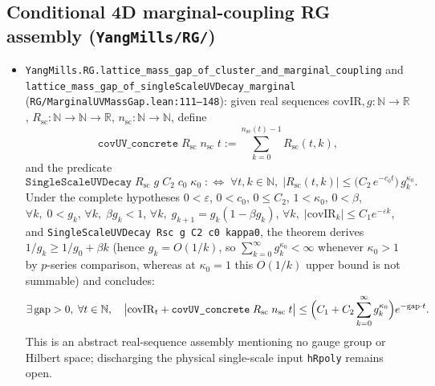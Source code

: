 \documentclass[11pt]{article}
\newcommand{\R}{\mathbb{R}}
\begin{document}
\subsection{Conditional 4D marginal-coupling RG assembly (\texttt{YangMills/RG/})}
\begin{itemize}
  \item \nolinkurl{YangMills.RG.lattice_mass_gap_of_cluster_and_marginal_coupling} and
  \nolinkurl{lattice_mass_gap_of_singleScaleUVDecay_marginal}
  (\texttt{RG/MarginalUVMassGap.lean:111--148}): given real sequences
  $\mathrm{covIR}, g : \mathbb{N} \to \R$, $R_{\mathrm{sc}} : \mathbb{N} \to \mathbb{N} \to \R$,
  $n_{\mathrm{sc}} : \mathbb{N} \to \mathbb{N}$, define
  \[
    \texttt{covUV\_concrete}\;R_{\mathrm{sc}}\;n_{\mathrm{sc}}\;t
    := \sum_{k=0}^{n_{\mathrm{sc}}(t)-1} R_{\mathrm{sc}}(t,k),
  \]
  and the predicate
  \[
    \texttt{SingleScaleUVDecay}\;R_{\mathrm{sc}}\;g\;C_2\;c_0\;\kappa_0
    \;:\Longleftrightarrow\;
    \forall t, k \in \mathbb{N},\;
    |R_{\mathrm{sc}}(t,k)| \le \bigl(C_2\, e^{-c_0 t}\bigr)\, g_k^{\kappa_0}.
  \]
  Under the complete hypotheses $0 < \varepsilon$, $0 < c_0$, $0 \le C_2$, $1 < \kappa_0$,
  \textbf{$0 < \beta$}, $\forall k,\; 0 < g_k$, $\forall k,\; \beta g_k < 1$,
  $\forall k,\; g_{k+1} = g_k(1 - \beta g_k)$,
  $\forall k,\; |\mathrm{covIR}_k| \le C_1 e^{-\varepsilon k}$, and
  \texttt{SingleScaleUVDecay Rsc g C2 c0 kappa0}, the theorem derives $1/g_k \ge 1/g_0 + \beta k$
  (hence $g_k = O(1/k)$, so $\sum_{k=0}^\infty g_k^{\kappa_0} < \infty$ whenever $\kappa_0 > 1$
  by $p$-series comparison, whereas at $\kappa_0 = 1$ this $O(1/k)$ upper bound is not
  summable) and concludes:
  \[
    \exists\,\mathrm{gap} > 0,\;\forall t \in \mathbb{N},\quad
    \bigl|\mathrm{covIR}_t + \texttt{covUV\_concrete}\;R_{\mathrm{sc}}\;n_{\mathrm{sc}}\;t\bigr|
    \le \Bigl(C_1 + C_2 \sum_{k=0}^\infty g_k^{\kappa_0}\Bigr) e^{-\mathrm{gap}\cdot t}.
  \]
  This is an abstract real-sequence assembly mentioning no gauge group or Hilbert space;
  discharging the physical single-scale input \texttt{hRpoly} remains open.
\end{itemize}
\end{document}
